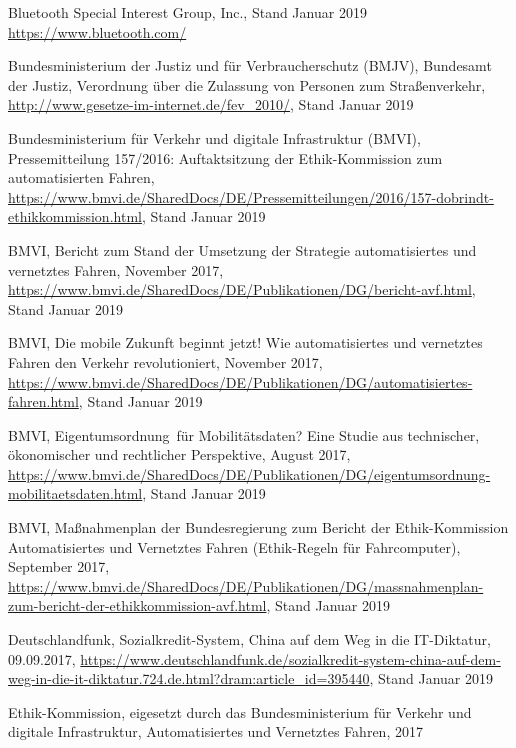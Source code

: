 \documentclass[twoside,a4paper,12pt]{article}
\begin{document}
\begin{thebibliography}{99}

 Bluetooth Special Interest Group, Inc., Stand Januar 2019\\ \url{https://www.bluetooth.com/}

 Bundesministerium der Justiz und für Verbraucherschutz (BMJV), Bundesamt der Justiz, Verordnung über die Zulassung von Personen zum Straßenverkehr, 
\url{http://www.gesetze-im-internet.de/fev_2010/}, Stand Januar 2019

 Bundesministerium für Verkehr und digitale Infrastruktur (BMVI), Pressemitteilung 157/2016: Auftaktsitzung der Ethik-Kommission zum automatisierten Fahren,
\url{https://www.bmvi.de/SharedDocs/DE/Pressemitteilungen/2016/157-dobrindt-ethikkommission.html}, Stand Januar 2019

 BMVI, Bericht zum Stand der Umsetzung der Strategie automatisiertes und vernetztes Fahren,
November 2017, \url{https://www.bmvi.de/SharedDocs/DE/Publikationen/DG/bericht-avf.html}, Stand Januar 2019

 BMVI, Die mobile Zukunft beginnt jetzt! Wie automatisiertes und vernetztes Fahren den Verkehr revolutioniert,
November 2017, \url{https://www.bmvi.de/SharedDocs/DE/Publikationen/DG/automatisiertes-fahren.html}, Stand Januar 2019

 BMVI, \glqq Eigentumsordnung\grqq\ für Mobilitätsdaten? Eine Studie aus technischer, ökonomischer und rechtlicher Perspektive,
August 2017, \url{https://www.bmvi.de/SharedDocs/DE/Publikationen/DG/eigentumsordnung-mobilitaetsdaten.html}, Stand Januar 2019

 BMVI, Maßnahmenplan der Bundesregierung zum Bericht der Ethik-Kommission Automatisiertes und Vernetztes Fahren (Ethik-Regeln für
Fahrcomputer), September 2017, \url{https://www.bmvi.de/SharedDocs/DE/Publikationen/DG/massnahmenplan-zum-bericht-der-ethikkommission-avf.html}, 
Stand Januar 2019

 Deutschlandfunk, Sozialkredit-System, China auf dem Weg in die IT-Diktatur, 09.09.2017, \url{https://www.deutschlandfunk.de/sozialkredit-system-china-auf-dem-weg-in-die-it-diktatur.724.de.html?dram:article_id=395440}, Stand Januar 2019

 Ethik-Kommission, eigesetzt durch das Bundesministerium für Verkehr und digitale Infrastruktur, Automatisiertes und
Vernetztes Fahren, 2017


\end{thebibliography}
\end{document}
